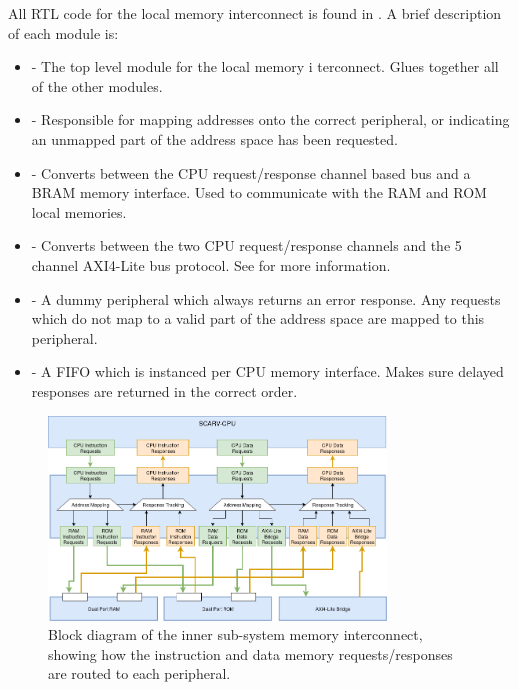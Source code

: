 All RTL code for the local memory interconnect is found in
.
A brief description of each module is:
\begin{itemize}

\item {} - 
    The top level module for the local memory 
    i terconnect. Glues together all of the other modules.

\item {} -
    Responsible for mapping addresses onto the correct peripheral,
    or indicating an unmapped part of the address space has been requested.

\item {} -
    Converts between the CPU request/response channel based bus and a
    BRAM memory interface.
    Used to communicate with the RAM and ROM local memories.

\item {} -
    Converts between the two CPU request/response channels and the 5 channel
    AXI4-Lite bus protocol.
    See  for more information.

\item {} - 
    A dummy peripheral which always returns an error response.
    Any requests which do not map to a valid part of the address space are
    mapped to this peripheral.

\item {} - 
    A FIFO which is instanced per CPU memory interface.
    Makes sure delayed responses are returned in the correct order.

\end{itemize}

\begin{figure}
\centering
\includegraphics[width=0.8\textwidth]{image/soc-local-ic.png}
\caption{
Block diagram of the \SCARVSOC inner sub-system memory interconnect, 
showing how the \SCARVCPU instruction and data memory requests/responses
are routed to each peripheral.
}
\label{fig:design:soc-local-ic}
\end{figure}

